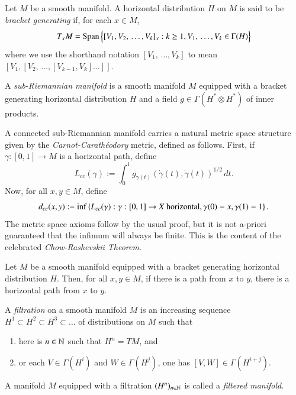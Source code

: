 \documentclass[leqno]{amsart}
\begin{document}
	\begin{definition}
		Let $M$ be a smooth manifold. A horizontal distribution $H$ on $M$ is said to be \textit{bracket generating} if, for each $x\in M$,
		$$T_xM=\operatorname{Span}\,\Bigl\{[V_1, V_2,\,\hdots, V_k]_x : k\geq 1, V_1,\,\hdots, V_k\in\Gamma(H)\Bigr\}$$
		where we use the shorthand notation $[V_1,\,\hdots, V_k]$ to mean $[V_1, [V_2,\,\hdots, [V_{k-1}, V_k]\hdots]]$.
	\end{definition}
	
	\begin{definition}\label{subriemannianmanifold}
		A \textit{sub-Riemannian manifold} is a smooth manifold $M$ equipped with a bracket generating horizontal distribution $H$ and a field $g\in\Gamma(H^*\otimes H^*)$ of inner products.
	\end{definition}
	
	A connected sub-Riemannian manifold carries a natural metric space structure given by the \textit{Carnot-Carath\'eodory} metric, defined as follows. First, if $\gamma:[0,1]\to M$ is a horizontal path, define
	$$L_{cc}(\gamma):=\int_0^1 g_{\gamma(t)}(\dot\gamma(t),\dot\gamma(t))^{1/2}\,dt.$$
	Now, for all $x,y\in M$, define
	$$d_{cc}(x,y):=\inf\left\{ L_{cc}(\gamma):\gamma:[0,1]\to X\text{ horizontal}, \gamma(0)=x, \gamma(1)=1 \right\}.$$
	The metric space axioms follow by the usual proof, but it is not a-priori guaranteed that the infimum will always be finite. This is the content of the celebrated \textit{Chow-Rashevskii Theorem}.
	
	\begin{theorem}\cite{chow, rashevskii}
		Let $M$ be a smooth manifold equipped with a bracket generating horizontal distribution $H$. Then, for all $x,y\in M$, if there is a path from $x$ to $y$, there is a horizontal path from $x$ to $y$.
	\end{theorem}
	
	\begin{definition}\label{filtereddef}
		A \textit{filtration} on a smooth manifold $M$ is an increasing sequence $H^1\subset H^2\subset H^3\subset \hdots$ of distributions on $M$ such that
		\begin{enumerate}
			\item\label{step} here is $n\in\mathbb{N}$ such that $H^n=TM$, and
			\item\label{filtration} or each $V\in\Gamma(H^i)$ and $W\in\Gamma(H^j)$, one has $[V,W]\in\Gamma(H^{i+j})$.
		\end{enumerate}
		A manifold $M$ equipped with a filtration $(H^n)_{n\in\mathbb{N}}$ is called a \textit{filtered manifold}.%
	\end{definition}
	
\end{document}
